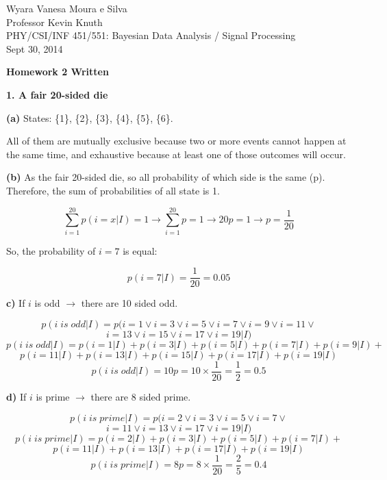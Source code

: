 \documentclass[a4paper, 12pt]{article}
\begin{document}
\begin{flushleft}

Wyara Vanesa Moura e Silva\\
Professor Kevin Knuth \\
PHY/CSI/INF 451/551: Bayesian Data Analysis / Signal Processing \\
Sept 30, 2014\\

\begin{center}
\textbf{Homework 2 Written}
\end{center}


\setlength{\parindent}{0.5in}

\textbf{1. A fair 20-sided die}

\textbf{(a)} States: \{1\}, \{2\}, \{3\}, \{4\}, \{5\}, \{6\}.

All of them are mutually exclusive because two or more events cannot happen at the same time, and exhaustive because at least one of those outcomes will occur.

\textbf{(b)} As the fair 20-sided die, so all probability of which side is the same (p). Therefore, the sum of probabilities of all state is 1.

$$ \displaystyle\sum_{i=1}^{20}p(i=x|I)=1 \rightarrow \displaystyle\sum_{i=1}^{20}p=1 \rightarrow 20p=1 \rightarrow p=\frac{1}{20} $$

So, the probability of $i=7$ is equal: 

$$ p(i=7|I)=\frac{1}{20} = 0.05 $$

\textbf{c)} If $i$ is odd $\rightarrow$ there are 10 sided odd.

$$ p(i \; is \; odd|I) = p(i=1 \vee i=3 \vee i=5 \vee i=7 \vee i=9 \vee i=11 \vee $$
$$ i=13 \vee i=15 \vee i=17 \vee i=19|I) $$
$$ p(i \; is \; odd|I) = p(i=1|I) + p(i=3|I) + p(i=5|I) + p(i=7|I) + p(i=9|I) +  $$
$$ p(i=11|I) + p(i=13|I) + p(i=15|I) + p(i=17|I) + p(i=19|I) $$
$$ p(i \; is \; odd|I) = 10p = 10 \times \frac{1}{20} = \frac{1}{2} = 0.5 $$

\textbf{d)} If $i$ is prime $\rightarrow$ there are 8 sided prime.

$$ p(i \; is \; prime|I) = p(i=2 \vee i=3 \vee i=5 \vee i=7 \vee $$
$$ i=11 \vee i=13 \vee i=17 \vee i=19|I) $$
$$ p(i \; is \; prime|I) = p(i=2|I) + p(i=3|I) + p(i=5|I) + p(i=7|I) + $$
$$ p(i=11|I) + p(i=13|I) + p(i=17|I) + p(i=19|I) $$
$$ p(i \; is \; prime|I) = 8p = 8 \times \frac{1}{20} = \frac{2}{5} = 0.4 $$


\end{flushleft}
\end{document}
